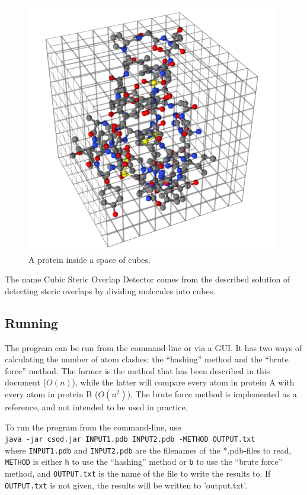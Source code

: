 \documentclass[a4paper]{article}
\begin{document}
\begin{figure}[H]
\centering
\includegraphics{res/molspace_big.png}
\caption{A protein inside a space of cubes.}
\label{fig:3dspace}
\end{figure}

The name Cubic Steric Overlap Detector comes from the described solution of detecting steric overlaps by dividing molecules into cubes.


\subsection*{Running}
The program can be run from the command-line or via a GUI. It has two ways of calculating the number of atom clashes: the ``hashing'' method and the ``brute force'' method. The former is the method that has been described in this document ($O(n)$), while the latter will compare every atom in protein A with every atom in protein B ($O(n^2)$). The brute force method is implemented as a reference, and not intended to be used in practice.

To run the program from the command-line, use\\
\texttt{java -jar csod.jar INPUT1.pdb INPUT2.pdb -METHOD OUTPUT.txt}\\
where \texttt{INPUT1.pdb} and \texttt{INPUT2.pdb} are the filenames of the *.pdb-files to read, \texttt{METHOD} is either \texttt{h} to use the ``hashing'' method or \texttt{b} to use the ``brute force'' method, and \texttt{OUTPUT.txt} is the name of the file to write the results to. If \texttt{OUTPUT.txt} is not given, the results will be written to 'output.txt'.
\end{document}
